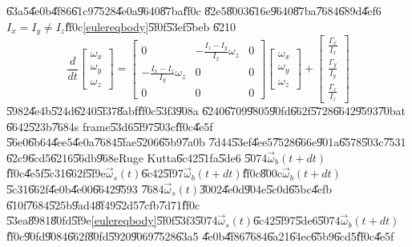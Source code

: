 \documentclass[12pt,a4paper]{article}
\begin{document}
\bigskip

\U{63a5}\U{4e0b}\U{4f86}\U{61c9}\U{7528}\U{4e0a}\U{9640}\U{87ba}\U{ff0c}%
\U{82e5}\U{8003}\U{616e}\U{9640}\U{87ba}\U{7684}\U{689d}\U{4ef6} $%
I_{x}=I_{y}\neq I_{z}$\U{ff0c}\ref{eulereqbody}\U{5f0f}\U{53ef}\U{5beb}%
\U{6210}%
\begin{equation}
\frac{d}{dt}\left[ 
\begin{array}{c}
\omega _{x} \\ 
\omega _{y} \\ 
\omega _{z}%
\end{array}%
\right] =\left[ 
\begin{array}{ccc}
0 & -\frac{I_{z}-I_{y}}{I_{x}}\omega _{z} & 0 \\ 
-\frac{I_{x}-I_{z}}{I_{y}}\omega _{z} & 0 & 0 \\ 
0 & 0 & 0%
\end{array}%
\right] \left[ 
\begin{array}{c}
\omega _{x} \\ 
\omega _{y} \\ 
\omega _{z}%
\end{array}%
\right] +\left[ 
\begin{array}{c}
\frac{\Gamma _{x}}{I_{x}} \\ 
\frac{\Gamma _{y}}{I_{y}} \\ 
\frac{\Gamma _{z}}{I_{z}}%
\end{array}%
\right]
\end{equation}%
\U{5982}\U{4e4b}\U{524d}\U{6240}\U{5f37}\U{8abf}\U{ff0c}\U{53f3}\U{908a}%
\U{6240}\U{6709}\U{9805}\U{90fd}\U{662f}\U{5728}\U{6642}\U{9593}\U{70ba}t%
\U{6642}\U{523b}\U{7684}s frame\U{53d6}\U{5f97}\U{503c}\U{ff0c}\U{4e5f}%
\U{56e0}\U{6b64}\U{4ee5}\U{4e0a}\U{7684}\U{5fae}\U{5206}\U{65b9}\U{7a0b}%
\U{7d44}\U{53ef}\U{4ee5}\U{7528}\U{666e}\U{901a}\U{6578}\U{503c}\U{7531}%
\U{62c9}\U{6cd5}\U{6216}\U{56db}\U{968e}Ruge Kutta\U{6c42}\U{51fa}\U{5de6}%
\U{5074}$\vec{\omega}_{b}(t+dt)$\U{ff0c}\U{4e5f}\U{5c31}\U{662f}\U{5f9e}$%
\vec{\omega}_{s}(t)$\U{6c42}\U{5f97}$\vec{\omega}_{b}(t+dt)$\U{ff0c}\U{800c}$%
\vec{\omega}_{b}(t+dt)$\U{5c31}\U{662f}\U{4e0b}\U{4e00}\U{6642}\U{9593}%
\U{7684}$\vec{\omega}_{s}(t)$\U{3002}\U{4e0d}\U{904e}\U{5c0d}\U{65bc}\U{4efb}%
\U{610f}\U{7684}\U{525b}\U{9ad4}\U{8f49}\U{52d5}\U{7cfb}\U{7d71}\U{ff0c}%
\U{53ea}\U{8981}\U{80fd}\U{5f9e}\ref{eulereqbody}\U{5f0f}\U{53f3}\U{5074}$%
\vec{\omega}_{s}(t)$\U{6c42}\U{5f97}\U{5de6}\U{5074}$\vec{\omega}_{b}(t+dt)$%
\U{ff0c}\U{90fd}\U{9084}\U{662f}\U{80fd}\U{5920}\U{9069}\U{7528}\U{63a5}%
\U{4e0b}\U{4f86}\U{7684}\U{6a21}\U{64ec}\U{65b9}\U{6cd5}\U{ff0c}\U{4e5f}%
\end{document}
